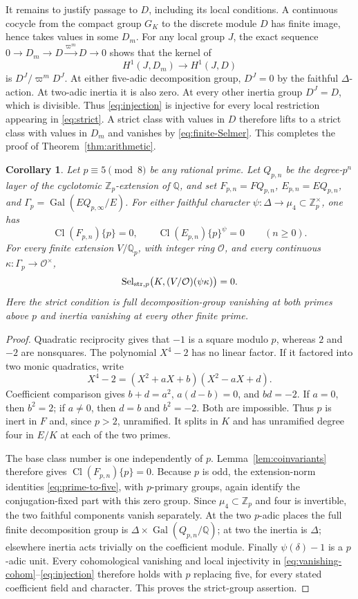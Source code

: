\documentclass[11pt]{article}
\newtheorem{corollary}[theorem]{Corollary}
\newcommand{\Q}{\mathbb Q}
\newcommand{\Z}{\mathbb Z}
\newcommand{\Cl}{\operatorname{Cl}}
\newcommand{\Gal}{\operatorname{Gal}}
\newcommand{\Sel}{\operatorname{Sel}}
\begin{document}
It remains to justify passage to $D$, including its local conditions.
A continuous cocycle from the compact group $G_K$ to the discrete
module $D$ has finite image, hence takes values in some $D_m$.
For any local group $J$, the exact sequence
$0\to D_m\to D\xrightarrow{\varpi^m}D\to0$ shows that the kernel of
\[
 H^1(J,D_m)\longrightarrow H^1(J,D)
 \tag{30}\label{eq:injection}
\]
is $D^J/\varpi^m D^J$. At either five-adic decomposition group,
$D^J=0$ by the faithful $\Delta$-action. At two-adic inertia it is
also zero. At every other inertia group $D^J=D$, which is divisible.
Thus \eqref{eq:injection} is injective for every local restriction
appearing in \eqref{eq:strict}. A strict class with values in $D$
therefore lifts to a strict class with values in $D_m$ and vanishes
by \eqref{eq:finite-Selmer}. This completes the proof of
Theorem~\ref{thm:arithmetic}.

\begin{corollary}\label{cor:prime-family}
Let $p\equiv5\pmod8$ be any rational prime. Let $Q_{p,n}$ be the
degree-$p^n$ layer of the cyclotomic $\Z_p$-extension of $\Q$, and set
$F_{p,n}=FQ_{p,n}$, $E_{p,n}=EQ_{p,n}$, and
$\Gamma_p=\Gal(EQ_{p,\infty}/E)$.
For either faithful character
$\psi:\Delta\to\mu_4\subset\Z_p^\times$, one has
\[
 \Cl(F_{p,n})\{p\}=0,\qquad
 \Cl(E_{p,n})\{p\}^\psi=0\qquad(n\ge0).
\]
For every finite extension $V/\Q_p$, with integer ring $\mathcal O$, and
every continuous $\kappa:\Gamma_p\to\mathcal O^\times$,
\[
 \Sel_{{\rm str},p}\bigl(K,(V/\mathcal O)(\psi\kappa)\bigr)=0.
\]
Here the strict condition is full decomposition-group vanishing at both
primes above $p$ and inertia vanishing at every other finite prime.
\end{corollary}
\begin{proof}
Quadratic reciprocity gives that $-1$ is a square modulo $p$, whereas
$2$ and $-2$ are nonsquares. The polynomial $X^4-2$ has no linear
factor. If it factored into two monic quadratics, write
\[
 X^4-2=(X^2+aX+b)(X^2-aX+d).
\]
Coefficient comparison gives
$b+d=a^2$, $a(d-b)=0$, and $bd=-2$.
If $a=0$, then $b^2=2$; if $a\ne0$, then $d=b$ and $b^2=-2$.
Both are impossible. Thus $p$ is inert in $F$ and, since $p>2$,
unramified. It splits in $K$ and has unramified degree four in $E/K$
at each of the two primes.

The base class number is one independently of $p$.
Lemma~\ref{lem:coinvariants} therefore gives
$\Cl(F_{p,n})\{p\}=0$. Because $p$ is odd, the extension-norm
identities \eqref{eq:prime-to-five}, with $p$-primary groups, again
identify the conjugation-fixed part with this zero group. Since
$\mu_4\subset\Z_p$ and four is invertible, the two faithful
components vanish separately. At the two $p$-adic places the full
finite decomposition group is $\Delta\times\Gal(Q_{p,n}/\Q)$;
at two the inertia is $\Delta$; elsewhere inertia acts trivially
on the coefficient module. Finally $\psi(\delta)-1$ is a $p$-adic
unit. Every cohomological vanishing and local injectivity in
\eqref{eq:vanishing-cohom}--\eqref{eq:injection} therefore holds with
$p$ replacing five, for every stated coefficient field and character.
This proves the strict-group assertion.
\end{proof}
\end{document}
